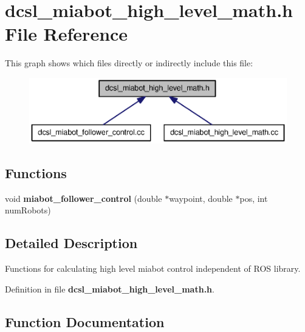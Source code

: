 \section{dcsl\-\_\-miabot\-\_\-high\-\_\-level\-\_\-math.\-h \-File \-Reference}
\label{dcsl__miabot__high__level__math_8h}
\-This graph shows which files directly or indirectly include this file\-:
\nopagebreak
\begin{figure}[H]
\begin{center}
\leavevmode
\includegraphics[width=350pt]{dcsl__miabot__high__level__math_8h__dep__incl}
\end{center}
\end{figure}
\subsection*{\-Functions}
\begin{DoxyCompactItemize}
\item 
void {\bf miabot\-\_\-follower\-\_\-control} (double $\ast$waypoint, double $\ast$pos, int num\-Robots)
\end{DoxyCompactItemize}


\subsection{\-Detailed \-Description}
\-Functions for calculating high level miabot control independent of \-R\-O\-S library. 

\-Definition in file {\bf dcsl\-\_\-miabot\-\_\-high\-\_\-level\-\_\-math.\-h}.



\subsection{\-Function \-Documentation}
